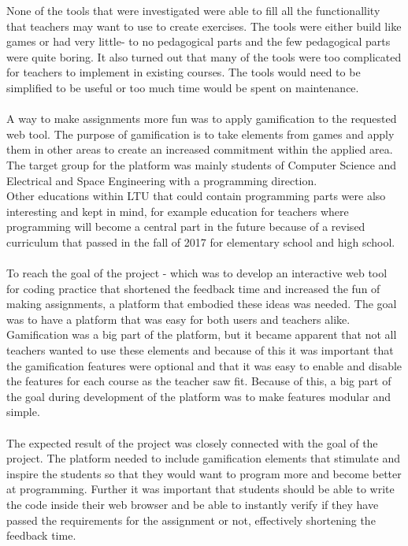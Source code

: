 None of the tools that were investigated were able to fill all the functionallity that teachers may want to use to create exercises. The tools were either build like games or had very little- to no pedagogical parts and the few pedagogical parts were quite boring. It also turned out that many of the tools were too complicated for teachers to implement in existing courses. The tools would need to be simplified to be useful or too much time would be spent on maintenance.\\
\\
A way to make assignments more fun was to apply gamification to the requested web tool. The purpose of gamification is to take elements from games and apply them in other areas to create an increased commitment within the applied area. The target group for the platform was mainly students of Computer Science and Electrical and Space Engineering with a programming direction.\\
Other educations within LTU that could contain programming parts were also interesting and kept in mind, for example education for teachers where programming will become a central part in the future because of a revised curriculum that passed in the fall of 2017 for elementary school and high school.\\
\\
To reach the goal of the project - which was to develop an interactive web tool for coding practice that shortened the feedback time and increased the fun of making assignments, a platform that embodied these ideas was needed. The goal was to have a platform that was easy for both users and teachers alike. Gamification was a big part of the platform, but it became apparent that not all teachers wanted to use these elements and because of this it was important that the gamification features were optional and that it was easy to enable and disable the features for each course as the teacher saw fit. Because of this, a big part of the goal during development of the platform was to make features modular and simple.\\
\\
The expected result of the project was closely connected with the goal of the project. The platform needed to include gamification elements that stimulate and inspire the  students so that they would want to program more and become better at programming. Further it was important that students should be able to write the code inside their web browser and be able to instantly verify if they have passed the requirements for the assignment or not, effectively shortening the feedback time.\\
